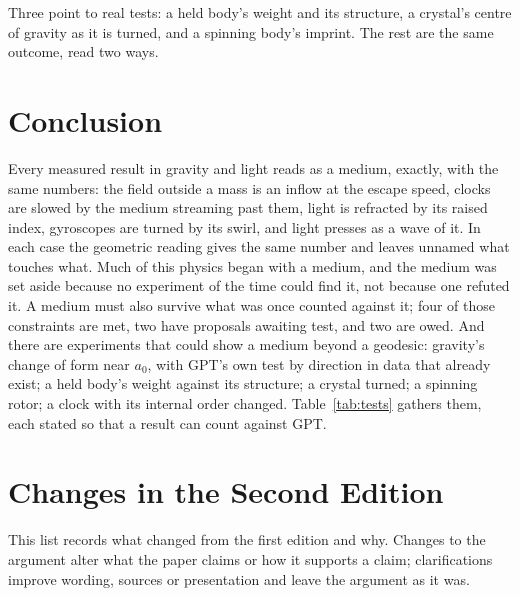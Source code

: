  Three point to real tests: a held body's weight and its structure, a crystal's centre of gravity as it is turned, and a spinning body's imprint. The rest are the same outcome, read two ways.

\section*{Conclusion}

Every measured result in gravity and light reads as a medium, exactly, with the same numbers: the field outside a mass is an inflow at the escape speed, clocks are slowed by the medium streaming past them, light is refracted by its raised index, gyroscopes are turned by its swirl, and light presses as a wave of it. In each case the geometric reading gives the same number and leaves unnamed what touches what. Much of this physics began with a medium, and the medium was set aside because no experiment of the time could find it, not because one refuted it. A medium must also survive what was once counted against it; four of those constraints are met, two have proposals awaiting test, and two are owed. And there are experiments that could show a medium beyond a geodesic: gravity's change of form near $a_0$, with GPT's own test by direction in data that already exist; a held body's weight against its structure; a crystal turned; a spinning rotor; a clock with its internal order changed. Table~\ref{tab:tests} gathers them, each stated so that a result can count against GPT.

\clearpage
\section*{Changes in the Second Edition}

This list records what changed from the first edition and why. Changes to the argument alter what the paper claims or how it supports a claim; clarifications improve wording, sources or presentation and leave the argument as it was.

